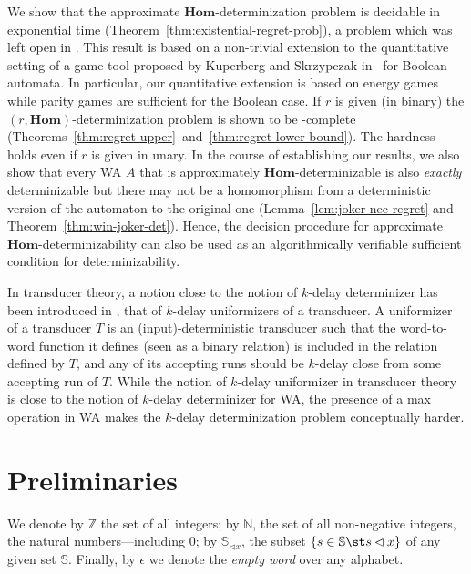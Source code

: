 \documentclass[a4paper]{article}
\begin{document}
We show that the approximate $\mathbf{Hom}$-determinization problem is
decidable in exponential time (Theorem~\ref{thm:existential-regret-prob}), a
problem which was left open in \cite{akl10}. This result is based on a
non-trivial extension to the quantitative setting of a game tool proposed by
Kuperberg and Skrzypczak in~\cite{ks15} for Boolean automata. In particular, our
quantitative extension is based on energy games~\cite{bflms08} while parity
games are sufficient for the Boolean case.  If $r$ is given (in
binary) the $(r,\mathbf{Hom})$-determinization problem is shown to be
\EXP-complete
(Theorems~\ref{thm:regret-upper}~and~\ref{thm:regret-lower-bound}). The hardness
holds even if $r$ is given in unary.  In the course of establishing our results,
we also show that every WA $A$ that is approximately
$\mathbf{Hom}$-determinizable is also {\em exactly} determinizable but there
may not be a homomorphism from a deterministic version of the automaton to the
original one (Lemma~\ref{lem:joker-nec-regret} and
Theorem~\ref{thm:win-joker-det}). Hence, the decision procedure for approximate
$\mathbf{Hom}$-determinizability can also be used as an algorithmically
verifiable sufficient condition for determinizability. 

In transducer theory, a notion close to the notion of $k$-delay
determinizer has been introduced in \cite{fjlw16}, that of $k$-delay
uniformizers of a transducer. A uniformizer of a transducer $T$ is an
(input)-deterministic transducer such that the word-to-word function it defines
(seen as a binary relation) is included in the relation defined by
$T$, and any of its accepting runs should be $k$-delay close from some
accepting run of $T$. While the notion of $k$-delay uniformizer in
transducer theory is close to the notion of $k$-delay determinizer for
WA, the presence of a max operation in WA makes the $k$-delay
determinization problem conceptually harder. 

\section{Preliminaries}\label{sec:prelims}
We denote by $\mathbb{Z}$ the set of all integers; by $\mathbb{N}$, the set of
all non-negative integers, \ie the natural numbers---including $0$; by
$\mathbb{S}_{\lhd x}$, the subset $\{s \in \mathbb{S} \st s \lhd x\}$ of
any given set $\mathbb{S}$.
%
Finally, by $\epsilon$ we denote the \emph{empty word} over any alphabet.
\end{document}
